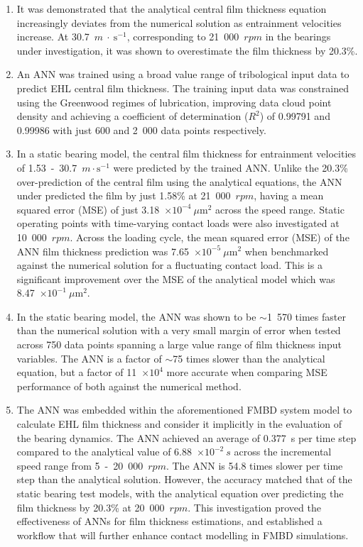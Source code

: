 \begin{enumerate}
	\item It was demonstrated that the analytical central film thickness equation increasingly deviates from the numerical solution as entrainment velocities increase. At 30.7~$m~\cdot~\mathrm{s}^{-1}$, corresponding to 21~000~$rpm$ in the bearings under investigation, it was shown to overestimate the film thickness by 20.3\%.
	
	\item An ANN was trained using a broad value range of tribological input data to predict EHL central film thickness. The training input data was constrained using the Greenwood regimes of lubrication, improving data cloud point density and achieving a coefficient of determination ($R^2$) of 0.99791 and 0.99986 with just 600 and 2~000 data points respectively.
	
	\item In a static bearing model, the central film thickness for entrainment velocities of 1.53~-~30.7~$m \cdot \mathrm{s}^{-1}$ were predicted by the trained ANN. Unlike the 20.3\% over-prediction of the central film using the analytical equations, the ANN under predicted the film by just 1.58\% at 21~000~$rpm$, having a mean squared error (MSE) of just 3.18~$\times 10^{-4}~\mu \mathrm{m}^2$ across the speed range. Static operating points with time-varying contact loads were also investigated at 10~000~$rpm$. Across the loading cycle, the mean squared error (MSE) of the ANN film thickness prediction was 7.65~$\times 10^{-5}~\mu \mathrm{m}^2$ when benchmarked against the numerical solution for a fluctuating contact load. This is a significant improvement over the MSE of the analytical model which was 8.47~$\times 10^{-1}~\mu\mathrm{m}^2$.
	
	\item In the static bearing model, the ANN was shown to be $\sim$1~570 times faster than the numerical solution with a very small margin of error when tested across 750 data points spanning a large value range of film thickness input variables. The ANN is a factor of $\sim$75 times slower than the analytical equation, but a factor of 11~$\times 10^{4}$ more accurate when comparing MSE performance of both against the numerical method.
	
	\item The ANN was embedded within the aforementioned FMBD system model to calculate EHL film thickness and consider it implicitly in the evaluation of the bearing dynamics. The ANN achieved an average of 0.377~s per time step compared to the analytical value of 6.88~$\times 10^{-2}~s$ across the incremental speed range from 5~-~20~000~$rpm$. The ANN is 54.8 times slower per time step than the analytical solution. However, the accuracy matched that of the static bearing test models, with the analytical equation over predicting the film thickness by 20.3\% at 20~000~$rpm$. This investigation proved the effectiveness of ANNs for film thickness estimations, and established a workflow that will further enhance contact modelling in FMBD simulations.
\end{enumerate}



